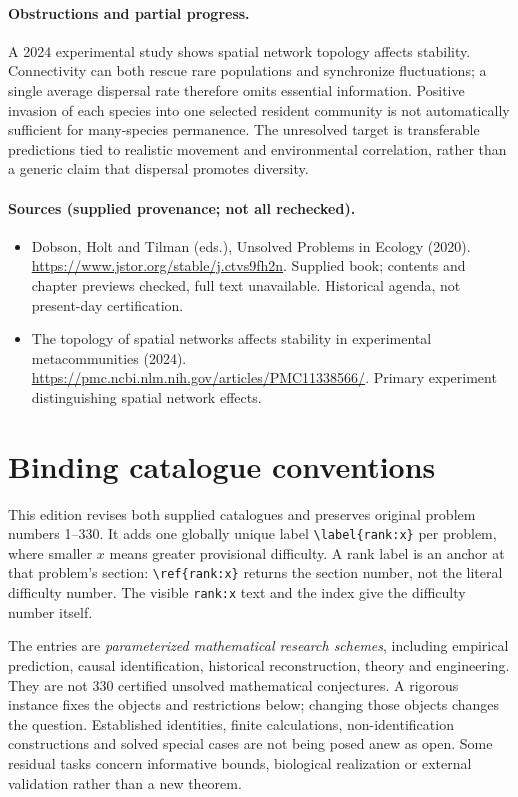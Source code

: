 \documentclass[11pt]{article}
\begin{document}
\paragraph{Obstructions and partial progress.} A 2024 experimental study shows spatial network topology affects stability. Connectivity can both rescue rare populations and synchronize fluctuations; a single average dispersal rate therefore omits essential information. Positive invasion of each species into one selected resident community is not automatically sufficient for many-species permanence. The unresolved target is transferable predictions tied to realistic movement and environmental correlation, rather than a generic claim that dispersal promotes diversity.
\paragraph{Sources (supplied provenance; not all rechecked).}
\begin{itemize}
\item Dobson, Holt and Tilman (eds.), Unsolved Problems in Ecology (2020). \url{https://www.jstor.org/stable/j.ctvs9fh2n}. Supplied book; contents and chapter previews checked, full text unavailable. Historical agenda, not present-day certification.
\item The topology of spatial networks affects stability in experimental metacommunities (2024). \url{https://pmc.ncbi.nlm.nih.gov/articles/PMC11338566/}. Primary experiment distinguishing spatial network effects.
\end{itemize}


\section*{Binding catalogue conventions}
This edition revises both supplied catalogues and preserves original problem numbers 1--330. It adds one globally unique label \verb|\label{rank:x}| per problem, where smaller $x$ means greater provisional difficulty. A rank label is an anchor at that problem's section: \verb|\ref{rank:x}| returns the section number, not the literal difficulty number. The visible \texttt{rank:x} text and the index give the difficulty number itself.

The entries are \emph{parameterized mathematical research schemes}, including empirical prediction, causal identification, historical reconstruction, theory and engineering. They are not 330 certified unsolved mathematical conjectures. A rigorous instance fixes the objects and restrictions below; changing those objects changes the question. Established identities, finite calculations, non-identification constructions and solved special cases are not being posed anew as open. Some residual tasks concern informative bounds, biological realization or external validation rather than a new theorem.
\end{document}
